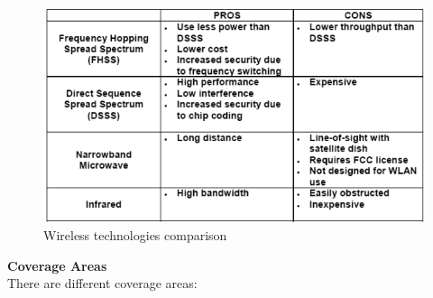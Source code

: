 \begin{figure}[!h] 
    \centering 
    \includegraphics[scale = 0.4]{images/tech-wireless-comparison-physical.png} 
    \caption{Wireless technologies comparison}
    \label{tech-wireless-comparison-physical}
\end{figure}
\textbf{Coverage Areas}\\[0.2cm]
There are different coverage areas:

